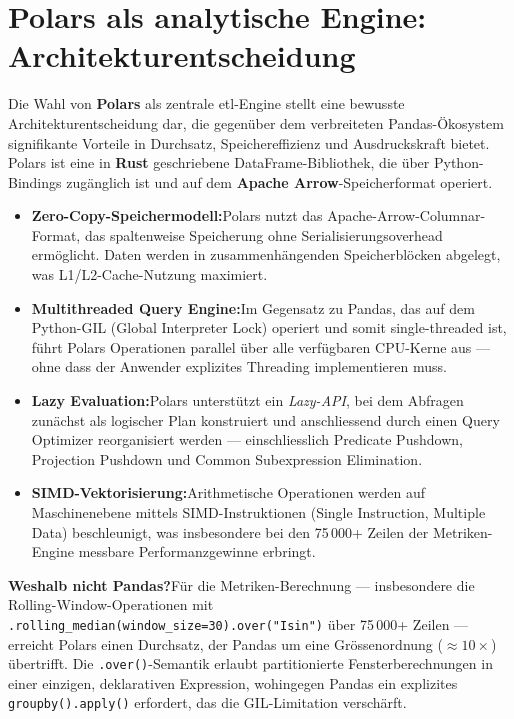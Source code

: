 \documentclass[11pt, a4paper, oneside, openany]{report}
\newcommand{\code}[1]{\texttt{\small\textcolor{DeepNavy}{#1}}}
\begin{document}
\section{Polars als analytische Engine: Architekturentscheidung}
\label{sec:polars}

Die Wahl von \textbf{Polars} als zentrale \gls{etl}-Engine stellt eine bewusste Architekturentscheidung dar, die gegenüber dem verbreiteten Pandas-Ökosystem signifikante Vorteile in Durchsatz, Speichereffizienz und Ausdruckskraft bietet. Polars ist eine in \textbf{Rust} geschriebene DataFrame-Bibliothek, die über Python-Bindings zugänglich ist und auf dem \textbf{Apache Arrow}-Speicherformat operiert.

\begin{infobox}
\begin{itemize}
  \item \textbf{Zero-Copy-Speichermodell:}\;Polars nutzt das Apache-Arrow-Columnar-Format, das spaltenweise Speicherung ohne Serialisierungsoverhead ermöglicht. Daten werden in zusammenhängenden Speicherblöcken abgelegt, was L1/L2-Cache-Nutzung maximiert.
  \item \textbf{Multithreaded Query Engine:}\;Im Gegensatz zu Pandas, das auf dem Python-GIL (Global Interpreter Lock) operiert und somit single-threaded ist, führt Polars Operationen parallel über alle verfügbaren CPU-Kerne aus --- ohne dass der Anwender explizites Threading implementieren muss.
  \item \textbf{Lazy Evaluation:}\;Polars unterstützt ein \textit{Lazy-API}, bei dem Abfragen zunächst als logischer Plan konstruiert und anschliessend durch einen Query Optimizer reorganisiert werden --- einschliesslich Predicate Pushdown, Projection Pushdown und Common Subexpression Elimination.
  \item \textbf{SIMD-Vektorisierung:}\;Arithmetische Operationen werden auf Maschinenebene mittels SIMD-Instruktionen (Single Instruction, Multiple Data) beschleunigt, was insbesondere bei den 75\,000+ Zeilen der Metriken-Engine messbare Performanzgewinne erbringt.
\end{itemize}
\end{infobox}

\textbf{Weshalb nicht Pandas?}\;Für die Metriken-Berechnung --- insbesondere die Rolling-Window-Operationen mit \code{.rolling\_median(window\_size=30).over("Isin")} über 75\,000+ Zeilen --- erreicht Polars einen Durchsatz, der Pandas um eine Grössenordnung ($\approx 10\times$) übertrifft. Die \code{.over()}-Semantik erlaubt partitionierte Fensterberechnungen in einer einzigen, deklarativen Expression, wohingegen Pandas ein explizites \code{groupby().apply()} erfordert, das die GIL-Limitation verschärft.
\end{document}
